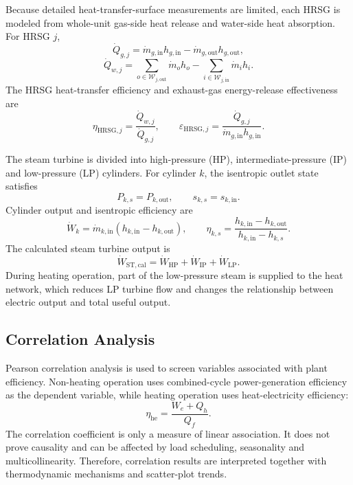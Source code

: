 \documentclass[12pt,a4paper]{article}
\begin{document}
Because detailed heat-transfer-surface measurements are limited, each HRSG is modeled from whole-unit gas-side heat release and water-side heat absorption. For HRSG \(j\),
\begin{equation}
\dot{Q}_{g,j}
=\dot{m}_{g,\mathrm{in}}h_{g,\mathrm{in}}
-\dot{m}_{g,\mathrm{out}}h_{g,\mathrm{out}},
\end{equation}
\begin{equation}
\dot{Q}_{w,j}
=
\sum_{o\in\mathcal{W}_{j,\mathrm{out}}}\dot{m}_oh_o
-
\sum_{i\in\mathcal{W}_{j,\mathrm{in}}}\dot{m}_ih_i.
\end{equation}
The HRSG heat-transfer efficiency and exhaust-gas energy-release effectiveness are
\begin{equation}
\eta_{\mathrm{HRSG},j}=\frac{\dot{Q}_{w,j}}{\dot{Q}_{g,j}},
\qquad
\varepsilon_{\mathrm{HRSG},j}
=\frac{\dot{Q}_{g,j}}{\dot{m}_{g,\mathrm{in}}h_{g,\mathrm{in}}}.
\label{eq:hrsg}
\end{equation}

The steam turbine is divided into high-pressure (HP), intermediate-pressure (IP) and low-pressure (LP) cylinders. For cylinder \(k\), the isentropic outlet state satisfies
\begin{equation}
P_{k,s}=P_{k,\mathrm{out}},\qquad s_{k,s}=s_{k,\mathrm{in}}.
\end{equation}
Cylinder output and isentropic efficiency are
\begin{equation}
\dot{W}_k=\dot{m}_{k,\mathrm{in}}(h_{k,\mathrm{in}}-h_{k,\mathrm{out}}),
\qquad
\eta_{k,s}=
\frac{h_{k,\mathrm{in}}-h_{k,\mathrm{out}}}
{h_{k,\mathrm{in}}-h_{k,s}}.
\label{eq:st-cylinder}
\end{equation}
The calculated steam turbine output is
\begin{equation}
\dot{W}_{\mathrm{ST,cal}}
=\dot{W}_{\mathrm{HP}}+\dot{W}_{\mathrm{IP}}+\dot{W}_{\mathrm{LP}}.
\label{eq:st-total}
\end{equation}
During heating operation, part of the low-pressure steam is supplied to the heat network, which reduces LP turbine flow and changes the relationship between electric output and total useful output.

\subsection{Correlation Analysis}

Pearson correlation analysis is used to screen variables associated with plant efficiency. Non-heating operation uses combined-cycle power-generation efficiency as the dependent variable, while heating operation uses heat-electricity efficiency:
\begin{equation}
\eta_{\mathrm{he}}=\frac{W_e+Q_h}{Q_f}.
\label{eq:heat-electricity}
\end{equation}
The correlation coefficient is only a measure of linear association. It does not prove causality and can be affected by load scheduling, seasonality and multicollinearity. Therefore, correlation results are interpreted together with thermodynamic mechanisms and scatter-plot trends.
\end{document}
